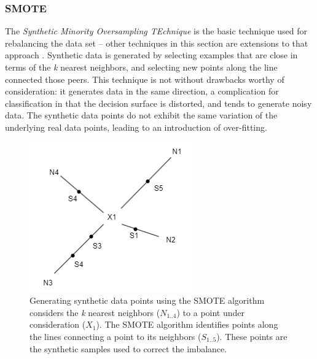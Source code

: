\documentclass[letterpaper]{article}
\begin{document}
{\subsubsection{SMOTE}
The \textit{Synthetic Minority Oversampling TEchnique} is the basic technique used for rebalancing the data set -- other techniques in this section are extensions to that approach \parencite{Chawla2002-dk}. Synthetic data is generated by selecting examples that are close in terms of the \textit{k} nearest neighbors, and selecting new points along the line connected those peers. This technique is not without drawbacks worthy of consideration: it generates data in the same direction, a complication for classification in that the decision surface is distorted, and tends to generate noisy data. The synthetic data points do not exhibit the same variation of the underlying real data points, leading to an introduction of over-fitting.
\begin{figure}[H]
	\centering
	\includegraphics[scale=0.35]{./figures/smote.png}
	\caption[SMOTE selection of synthetic data points]{Generating synthetic data points using the SMOTE algorithm considers the \textit{k} nearest neighbors ($N_{1..4}$) to a point under consideration ($X_1$).  The SMOTE algorithm identifies points along the lines connecting a point to its neighbors ($S_{1..5}$). These points are the synthetic samples used to correct the imbalance.}
	\label{fig:smote}
\end{figure}

}
\end{document}
